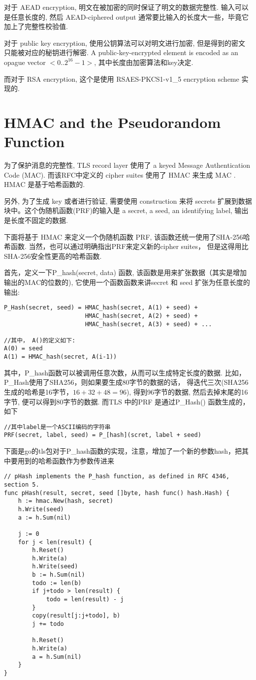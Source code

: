 \documentclass[a4paper]{ctexart}
\begin{document}
对于 AEAD encryption, 明文在被加密的同时保证了明文的数据完整性. 输入可以是任意长度的, 然后 AEAD-ciphered output 通常要比输入的长度大一些，毕竟它加上了完整性校验值.

对于 public key encryption, 使用公钥算法可以对明文进行加密, 但是得到的密文只能被对应的秘钥进行解密. 
A public-key-encrypted element is encoded as an opague vector $<0..2^{16}-1>$, 其中长度由加密算法和key决定. 

而对于 RSA encryption, 这个是使用 RSAES-PKCS1-v1\_5 encryption scheme 实现的.

\section{HMAC and the Pseudorandom Function}
为了保护消息的完整性, TLS record layer 使用了 a keyed Message Authentication Code (MAC). 而该RFC中定义的 cipher suites 使用了
HMAC 来生成 MAC . HMAC 是基于哈希函数的.

另外, 为了生成 key 或者进行验证, 需要使用 construction 来将 secrets 扩展到数据块中。这个伪随机函数(PRF)的输入是 a secret, a seed, an identifying label,
输出是长度不固定的数据.

下面将基于 HMAC 来定义一个伪随机函数 PRF, 该函数还统一使用了SHA-256哈希函数. 当然，也可以通过明确指出PRF来定义新的cipher suites， 但是这得用比SHA-256安全性更高的哈希函数.

首先，定义一下P\_hash(secret, data) 函数, 该函数是用来扩张数据（其实是增加输出的MAC的位数的), 它使用一个函数函数来讲secret 和 seed 扩张为任意长度的输出:
\begin{verbatim}
P_Hash(secret, seed) = HMAC_hash(secret, A(1) + seed) + 
                       HMAC_hash(secret, A(2) + seed) +
                       HMAC_hash(secret, A(3) + seed) + ...
                       
//其中， A()的定义如下:
A(0) = seed
A(1) = HMAC_hash(secret, A(i-1))
\end{verbatim}
其中，P\_hash函数可以被调用任意次数，从而可以生成特定长度的数据. 比如，P\_Hash使用了SHA256，则如果要生成80字节的数据的话，
得迭代三次(SHA256生成的哈希是16字节，$16 + 32 + 48 = 96$), 得到96字节的数据,
然后去掉末尾的16字节, 便可以得到80字节的数据.
而TLS 中的PRF 是通过P\_Hash() 函数生成的，如下
\begin{verbatim}
//其中label是一个ASCII编码的字符串
PRF(secret, label, seed) = P_[hash](scret, label + seed)
\end{verbatim}

下面是go的tls包对于P\_hash函数的实现，注意，增加了一个新的参数hash，把其中要用到的哈希函数作为参数传进来
\begin{lstlisting}[frame=single, stepnumber=5, firstnumber=1, caption={go中对于pHash的实现}]
// pHash implements the P_hash function, as defined in RFC 4346, section 5.
func pHash(result, secret, seed []byte, hash func() hash.Hash) {
	h := hmac.New(hash, secret)
	h.Write(seed)
	a := h.Sum(nil)

	j := 0
	for j < len(result) {
		h.Reset()
		h.Write(a)
		h.Write(seed)
		b := h.Sum(nil)
		todo := len(b)
		if j+todo > len(result) {
			todo = len(result) - j
		}
		copy(result[j:j+todo], b)
		j += todo

		h.Reset()
		h.Write(a)
		a = h.Sum(nil)
	}
}
\end{lstlisting}
\end{document}
